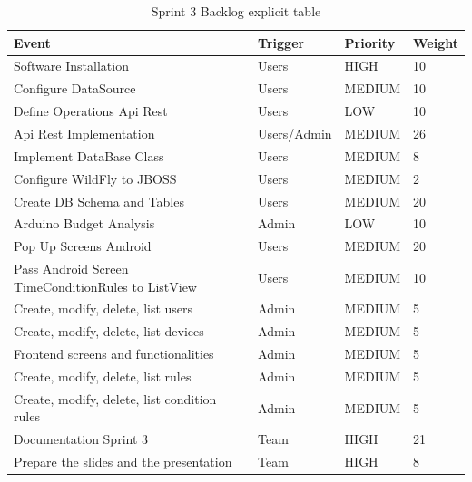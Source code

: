 \documentclass[11pt,a4paper]{article}
\begin{document}
\begin{table}[htbp]
\begin{tabular}{|l|l|l|l|} 
\hline
Event                                                & Trigger     & Priority & Weight \\ \hline \hline
Software Installation                                & Users       & HIGH     & 10     \\ \hline
Configure DataSource                                 & Users       & MEDIUM   & 10     \\ \hline
Define Operations Api Rest                           & Users       & LOW      & 10     \\ \hline
Api Rest Implementation                              & Users/Admin & MEDIUM   & 26     \\ \hline
Implement DataBase Class                             & Users       & MEDIUM   & 8      \\ \hline
Configure WildFly to JBOSS                           & Users       & MEDIUM   & 2      \\ \hline
Create DB Schema and Tables                          & Users       & MEDIUM   & 20     \\ \hline
Arduino Budget Analysis                              & Admin       & LOW      & 10     \\ \hline
Pop Up Screens Android                               & Users       & MEDIUM   & 20     \\ \hline
Pass Android Screen TimeConditionRules to ListView   & Users       & MEDIUM   & 10     \\ \hline
Create, modify, delete, list users                   & Admin       & MEDIUM   & 5      \\ \hline
Create, modify, delete, list devices                 & Admin       & MEDIUM   & 5      \\ \hline
Frontend screens and functionalities                 & Admin       & MEDIUM   & 5      \\ \hline
Create, modify, delete, list rules                   & Admin       & MEDIUM   & 5      \\ \hline
Create, modify, delete, list condition rules         & Admin       & MEDIUM   & 5      \\ \hline
Documentation Sprint 3                               & Team        & HIGH     & 21     \\ \hline
Prepare the slides and the presentation              & Team        & HIGH     & 8      \\ \hline
\end{tabular}
\caption{Sprint 3 Backlog explicit table}
\end{table}
\end{document}
